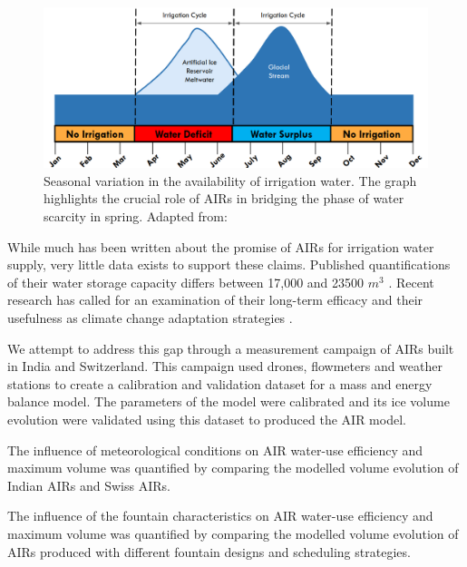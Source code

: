 \begin{figure}[t]
\includegraphics[width=12cm]{Figures/irrigation_cycles.png}

\caption{Seasonal variation in the availability of irrigation water. The graph highlights the crucial role of
AIRs in bridging the phase of water scarcity in spring. Adapted from: \cite{nusserLocalKnowledgeGlobal2016}}

\label{fig:irrigation_cycles}
\end{figure}

While much has been written about the promise of AIRs for irrigation water supply, very little data exists to
support these claims. Published quantifications of their water storage capacity differs between 17,000 and 23500
$m^3$ \citep{norphelSnowWaterHarvesting2015, baglaArtificialGlaciersHelp1998}. Recent research has called for an
examination of their long-term efficacy and their usefulness as climate change adaptation strategies
\citep{clouseLadakhArtificialGlaciers2017}. 

We attempt to address this gap through a measurement campaign of AIRs built in India and Switzerland. This
campaign used drones, flowmeters and weather stations to create a calibration and validation dataset for a mass
and energy balance model. The parameters of the model were calibrated and its ice volume evolution were
validated using this dataset to produced the AIR model. 

The influence of meteorological conditions on AIR water-use efficiency and maximum volume was quantified by
comparing the modelled volume evolution of Indian AIRs and Swiss AIRs.

The influence of the fountain characteristics on AIR water-use efficiency and maximum volume was quantified by
comparing the modelled volume evolution of AIRs produced with different fountain designs and scheduling
strategies.
